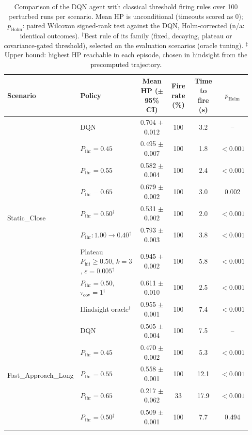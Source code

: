 \begin{table}[htbp]
\centering
\caption{Comparison of the DQN agent with classical threshold firing rules over 100 perturbed runs per scenario. Mean HP is unconditional (timeouts scored as 0); $p_{\mathrm{Holm}}$: paired Wilcoxon signed-rank test against the DQN, Holm-corrected (n/a: identical outcomes). $^{\dagger}$Best rule of its family (fixed, decaying, plateau or covariance-gated threshold), selected on the evaluation scenarios (oracle tuning). $^{\ddagger}$Upper bound: highest HP reachable in each episode, chosen in hindsight from the precomputed trajectory.}
\label{tab:comparison-traditional-rl}
\small
\begin{tabular}{llcccc}
\toprule
\textbf{Scenario} & \textbf{Policy} & \textbf{Mean HP ($\pm$95\% CI)} & \textbf{Fire rate (\%)} & \textbf{Time to fire (s)} & $p_{\mathrm{Holm}}$ \\
\midrule
\multirow{9}{*}{Static\_Close} & DQN & 0.704 $\pm$ 0.012 & 100 & 3.2 & -- \\
 & $P_{\mathrm{thr}}=0.45$ & 0.495 $\pm$ 0.007 & 100 & 1.8 & $<0.001$ \\
 & $P_{\mathrm{thr}}=0.55$ & 0.582 $\pm$ 0.004 & 100 & 2.4 & $<0.001$ \\
 & $P_{\mathrm{thr}}=0.65$ & 0.679 $\pm$ 0.002 & 100 & 3.0 & 0.002 \\
 & $P_{\mathrm{thr}}=0.50$$^{\dagger}$ & 0.531 $\pm$ 0.002 & 100 & 2.0 & $<0.001$ \\
 & $P_{\mathrm{thr}}: 1.00 \to 0.40$$^{\dagger}$ & 0.793 $\pm$ 0.003 & 100 & 3.8 & $<0.001$ \\
 & Plateau $P_{\mathrm{hit}}\geq0.50$, $k=3$, $\varepsilon=0.005$$^{\dagger}$ & 0.945 $\pm$ 0.002 & 100 & 5.8 & $<0.001$ \\
 & $P_{\mathrm{thr}}=0.50$, $\tau_{\mathrm{cov}}=1$$^{\dagger}$ & 0.611 $\pm$ 0.010 & 100 & 2.5 & $<0.001$ \\
 & Hindsight oracle$^{\ddagger}$ & 0.955 $\pm$ 0.001 & 100 & 7.4 & $<0.001$ \\
\midrule
\multirow{9}{*}{Fast\_Approach\_Long} & DQN & 0.505 $\pm$ 0.004 & 100 & 7.5 & -- \\
 & $P_{\mathrm{thr}}=0.45$ & 0.470 $\pm$ 0.002 & 100 & 5.3 & $<0.001$ \\
 & $P_{\mathrm{thr}}=0.55$ & 0.558 $\pm$ 0.001 & 100 & 12.1 & $<0.001$ \\
 & $P_{\mathrm{thr}}=0.65$ & 0.217 $\pm$ 0.062 & 33 & 17.9 & $<0.001$ \\
 & $P_{\mathrm{thr}}=0.50$$^{\dagger}$ & 0.509 $\pm$ 0.001 & 100 & 7.7 & 0.494 \\
$$
\end{tabular}
\end{table}
